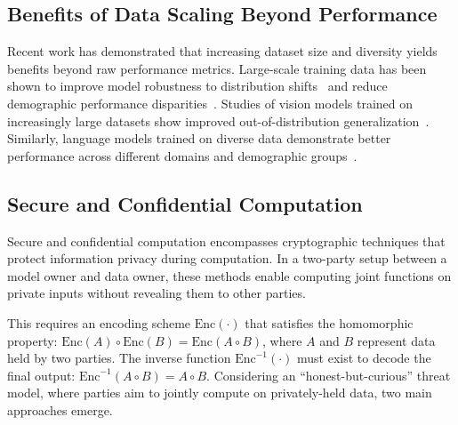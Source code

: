 
\subsection{Benefits of Data Scaling Beyond Performance}
Recent work has demonstrated that increasing dataset size and diversity yields benefits beyond raw performance metrics. Large-scale training data has been shown to improve model robustness to distribution shifts~\cite{taori2020measuring} and reduce demographic performance disparities~\cite{chen2018my}. Studies of vision models trained on increasingly large datasets show improved out-of-distribution generalization~\cite{miller2021accuracy}. Similarly, language models trained on diverse data demonstrate better performance across different domains and demographic groups~\cite{dodge2021documenting}.


\subsection{Secure and Confidential Computation}
\label{sec:related_secure}
Secure and confidential computation encompasses cryptographic techniques that protect information privacy during computation. In a two-party setup between a model owner and data owner, these methods enable computing joint functions on private inputs without revealing them to other parties.

This requires an encoding scheme $\mathrm{Enc}(\cdot)$ that satisfies the homomorphic property: $\mathrm{Enc}(A)\circ \mathrm{Enc}(B) = \mathrm{Enc} (A\circ B)$, where $A$ and $B$ represent data held by two parties. The inverse function $\mathrm{Enc}^{-1}(\cdot)$ must exist to decode the final output: $\mathrm{Enc}^{-1}(A\circ B ) = A\circ B $. Considering an ``honest-but-curious'' threat model, where parties aim to jointly compute on privately-held data, two main approaches emerge.


